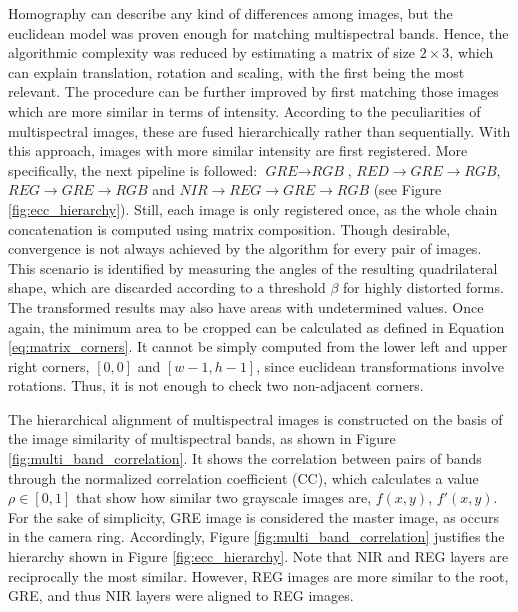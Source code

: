 Homography can describe any kind of differences among images, but the euclidean model was proven enough for matching multispectral bands. Hence, the algorithmic complexity was reduced by estimating a matrix of size $2 \times 3$, which can explain translation, rotation and scaling, with the first being the most relevant. The procedure can be further improved by first matching those images which are more similar in terms of intensity. According to the peculiarities of multispectral images, these are fused hierarchically rather than sequentially. With this approach, images with more similar intensity are first registered. More specifically, the next pipeline is followed: $\textit{GRE} \rightarrow \textit{RGB}$, $\textit{RED} \rightarrow \textit{GRE} \rightarrow \textit{RGB}$, $\textit{REG} \rightarrow \textit{GRE} \rightarrow \textit{RGB}$ and $\textit{NIR} \rightarrow \textit{REG} \rightarrow \textit{GRE} \rightarrow \textit{RGB}$ (see Figure \ref{fig:ecc_hierarchy}). Still, each image is only registered once, as the whole chain concatenation is computed using matrix composition. Though desirable, convergence is not always achieved by the algorithm for every pair of images. This scenario is identified by measuring the angles of the resulting quadrilateral shape, which are discarded according to a threshold $\beta$ for highly distorted forms. The transformed results may also have areas with undetermined values. Once again, the minimum area to be cropped can be calculated as defined in Equation \ref{eq:matrix_corners}. It cannot be simply computed from the lower left and upper right corners, $[0, 0]$ and $[w - 1, h - 1]$, since euclidean transformations involve rotations. Thus, it is not enough to check two non-adjacent corners.

The hierarchical alignment of multispectral images is constructed on the basis of the image similarity of multispectral bands, as shown in Figure \ref{fig:multi_band_correlation}. It shows the correlation between pairs of bands through the normalized correlation coefficient (CC), which calculates a value $\rho \in [0,1]$ that show how similar two grayscale images are, $f(x, y)$, $f'(x, y)$. For the sake of simplicity, GRE image is considered the master image, as occurs in the camera ring. Accordingly, Figure \ref{fig:multi_band_correlation} justifies the hierarchy shown in Figure \ref{fig:ecc_hierarchy}. Note that NIR and REG layers are reciprocally the most similar. However, REG images are more similar to the root, GRE, and thus NIR layers were aligned to REG images.

